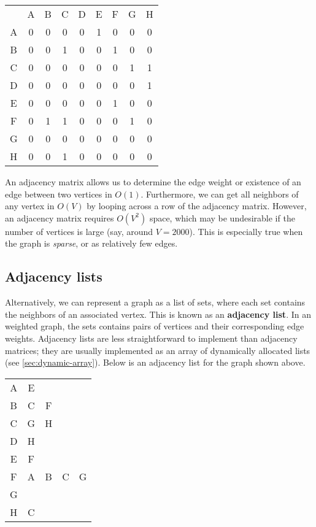 \begin{center}
\begin{minipage}{0.45\linewidth}
\begin{tabular}{c c c c c c c c c}
         & A & B & C & D & E & F & G & H \\
A        & 0 & 0 & 0 & 0 & 1 & 0 & 0 & 0 \\
B        & 0 & 0 & 1 & 0 & 0 & 1 & 0 & 0 \\
C        & 0 & 0 & 0 & 0 & 0 & 0 & 1 & 1 \\
D        & 0 & 0 & 0 & 0 & 0 & 0 & 0 & 1 \\
E        & 0 & 0 & 0 & 0 & 0 & 1 & 0 & 0 \\
F        & 0 & 1 & 1 & 0 & 0 & 0 & 1 & 0 \\
G        & 0 & 0 & 0 & 0 & 0 & 0 & 0 & 0 \\
H        & 0 & 0 & 1 & 0 & 0 & 0 & 0 & 0 \\
\end{tabular}
\end{minipage}
\end{center}

An adjacency matrix allows us to determine the edge weight or existence of an edge between two vertices in $O(1)$. Furthermore, we can get all neighbors of any vertex in $O(V)$ by looping across a row of the adjacency matrix. However, an adjacency matrix requires $O(V^2)$ space, which may be undesirable if the number of vertices is large (say, around $V = 2000$). This is especially true when the graph is \textit{sparse}, or as relatively few edges. 

\subsection{Adjacency lists}

Alternatively, we can represent a graph as a list of sets, where each set contains the neighbors of an associated vertex. This is known as an \textbf{adjacency list}. In an weighted graph, the sets contains pairs of vertices and their corresponding edge weights. Adjacency lists are less straightforward to implement than adjacency matrices; they are usually implemented as an array of dynamically allocated lists (see \ref{sec:dynamic-array}). Below is an adjacency list for the graph shown above. 

\begin{center}
\begin{minipage}{0.45\linewidth}
\begin{tabular}{ c|c c c c}
A        & E \\
B        & C & F \\
C        & G & H \\
D        & H \\
E        & F \\
F        & A & B & C & G \\
G        & \\
H        & C \\
\end{tabular}
\end{minipage}
\end{center}

